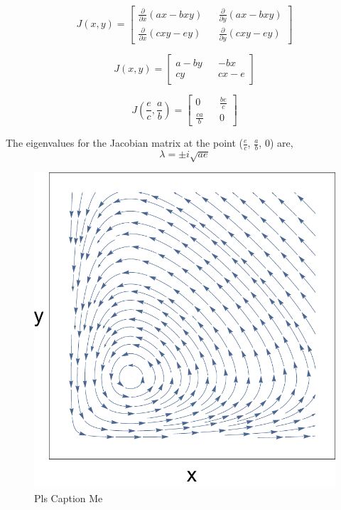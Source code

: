 \documentclass[11pt,oneside]{article}
\begin{document}
	\begin{equation}
	J(x,y) = 
	\begin{bmatrix}
	\frac{\partial}{\partial x}(ax - bxy) && \frac{\partial}{\partial y}(ax - bxy) \\
	\frac{\partial}{\partial x}(cxy - ey) && \frac{\partial}{\partial y}(cxy - ey)
	\end{bmatrix}
	\end{equation}
	
	\begin{equation}
	J(x,y) = 
	\begin{bmatrix}
	a - by && -bx \\
	cy && cx - e
	\end{bmatrix}
	\end{equation}
	
	\begin{equation}
	J(\frac{e}{c},\frac{a}{b}) = 
	\begin{bmatrix}
	0 && \frac{be}{c} \\
	\frac{ca}{b} && 0
	\end{bmatrix}
	\end{equation}
	
	The eigenvalues for the Jacobian matrix at the point ($\frac{e}{c}$, $\frac{a}{b}$, $0$) are,
	\[\lambda = \pm i\sqrt{ae}\]
	
	\begin{figure}[H]
		\center
		\includegraphics[scale=0.5]{XY}
		\caption{Pls Caption Me}
	\end{figure}
	
\end{document}
